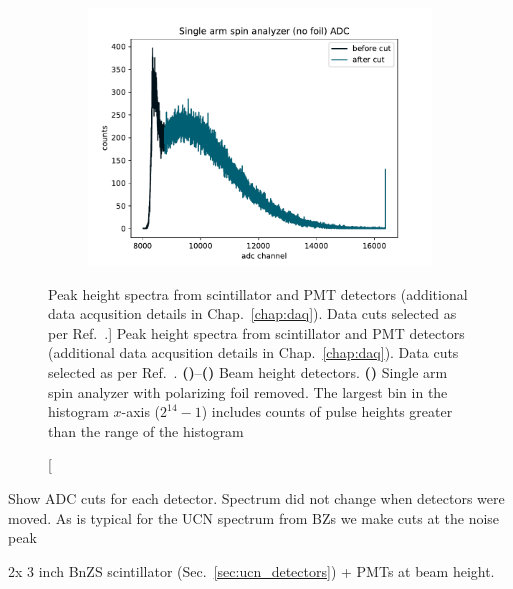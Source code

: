 \begin{figure}
\begin{subfigure}{.5\textwidth}
  \caption{}\label{subfig:beam_det_2_adc}
\end{subfigure}
\begin{subfigure}{.5\textwidth}
  \centering
  \includegraphics[width=\textwidth]{figures/2021_single_arm_no_foil_adc.pdf}
  \caption{}\label{subfig:single_arm_no_foil_adc}
\end{subfigure}
\caption
[Peak height spectra from \BZnS scintillator and PMT detectors (additional data acqusition details in Chap.~\ref{chap:daq}).  Data cuts selected as per Ref.~\cite{jeph_multilayer_2015}.]
{Peak height spectra from \BZnS scintillator and PMT detectors (additional data acqusition details in Chap.~\ref{chap:daq}). Data cuts selected as per Ref.~\cite{jeph_multilayer_2015}. \textbf{()}--\textbf{()} Beam height detectors. \textbf{()} Single arm spin analyzer with polarizing foil removed. The largest bin in the histogram $x$-axis ($2^{14}-1$) includes counts of pulse heights greater than the range of the histogram}
\label{fig:2021_detector_adc}
\end{figure}

Show ADC cuts for each detector. Spectrum did not change when detectors were moved. As is typical for the UCN spectrum from BZs we make cuts at the noise peak~\cite{jeph_multilayer_2015}

2x 3 inch BnZS scintillator (Sec.~\ref{sec:ucn_detectors})  + PMTs at beam height. 

